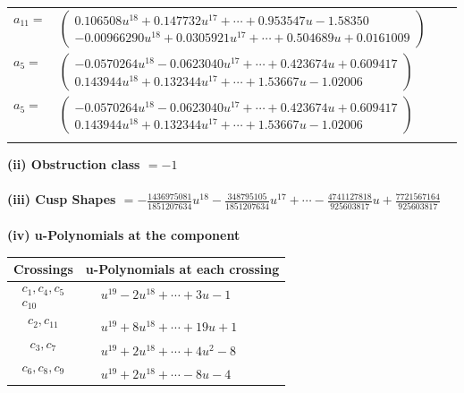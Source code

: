 \documentclass[1p]{elsarticle_modified}
\theoremstyle{definition}
\begin{document}
\begin{tabular}{m{7pt} m{180pt} m{7pt} m{180pt} }
\flushright $a_{11}=$&$\begin{pmatrix}0.106508 u^{18}+0.147732 u^{17}+\cdots+0.953547 u-1.58350\\-0.00966290 u^{18}+0.0305921 u^{17}+\cdots+0.504689 u+0.0161009\end{pmatrix}$ \\
\flushright $a_{5}=$&$\begin{pmatrix}-0.0570264 u^{18}-0.0623040 u^{17}+\cdots+0.423674 u+0.609417\\0.143944 u^{18}+0.132344 u^{17}+\cdots+1.53667 u-1.02006\end{pmatrix}$\\ \flushright $a_{5}=$&$\begin{pmatrix}-0.0570264 u^{18}-0.0623040 u^{17}+\cdots+0.423674 u+0.609417\\0.143944 u^{18}+0.132344 u^{17}+\cdots+1.53667 u-1.02006\end{pmatrix}$\\&\end{tabular}
\flushleft \textbf{(ii) Obstruction class $= -1$}\\~\\
\flushleft \textbf{(iii) Cusp Shapes $= -\frac{1436975081}{1851207634} u^{18}-\frac{348795105}{1851207634} u^{17}+\cdots-\frac{4741127818}{925603817} u+\frac{7721567164}{925603817}$}\\~\\
\newpage\renewcommand{\arraystretch}{1}
\flushleft \textbf{(iv) u-Polynomials at the component}\newline \\
\begin{tabular}{m{50pt}|m{274pt}}
Crossings & \hspace{64pt}u-Polynomials at each crossing \\
\hline $$\begin{aligned}c_{1},c_{4},c_{5}\\c_{10}\end{aligned}$$&$\begin{aligned}
&u^{19}-2 u^{18}+\cdots+3 u-1
\end{aligned}$\\
\hline $$\begin{aligned}c_{2},c_{11}\end{aligned}$$&$\begin{aligned}
&u^{19}+8 u^{18}+\cdots+19 u+1
\end{aligned}$\\
\hline $$\begin{aligned}c_{3},c_{7}\end{aligned}$$&$\begin{aligned}
&u^{19}+2 u^{18}+\cdots+4 u^2-8
\end{aligned}$\\
\hline $$\begin{aligned}c_{6},c_{8},c_{9}\end{aligned}$$&$\begin{aligned}
&u^{19}+2 u^{18}+\cdots-8 u-4
\end{aligned}$\\
\hline
\end{tabular}\\~\\
\end{document}
